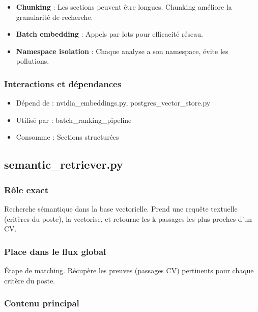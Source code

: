 \documentclass[12pt,a4paper,oneside]{book}
\begin{document}
\begin{itemize}
    \item \textbf{Chunking} : Les sections peuvent être longues. Chunking améliore la granularité de recherche.
    
    \item \textbf{Batch embedding} : Appels par lots pour efficacité réseau.
    
    \item \textbf{Namespace isolation} : Chaque analyse a son namespace, évite les pollutions.
\end{itemize}

\subsubsection{Interactions et dépendances}

\begin{itemize}
    \item Dépend de : nvidia\_embeddings.py, postgres\_vector\_store.py
    \item Utilisé par : batch\_ranking\_pipeline
    \item Consomme : Sections structurées
\end{itemize}

\subsection{semantic\_retriever.py}

\subsubsection{Rôle exact}

Recherche sémantique dans la base vectorielle. Prend une requête textuelle (critères du poste), la vectorise, et retourne les k passages les plus proches d'un CV.

\subsubsection{Place dans le flux global}

Étape de matching. Récupère les preuves (passages CV) pertinents pour chaque critère du poste.

\subsubsection{Contenu principal}
\end{document}
